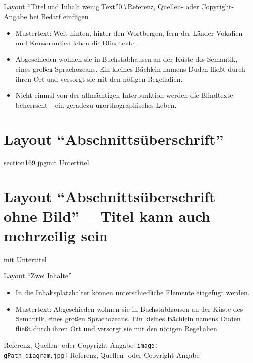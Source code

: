 \documentclass[hyperref={pdfpagelabels=false}, aspectratio=169, t]{beamer}  %
\newcommand{\gPath}{Graphics/}									%
\begin{document}
\begin{textFrame}{Layout ``Titel und Inhalt wenig Text''}{0.7}{Referenz, Quellen- oder Copyright-Angabe bei Bedarf einfügen}

	\begin{itemize}
		\item Mustertext: Weit hinten, hinter den Wortbergen, fern der Länder Vokalien und Konsonantien leben die Blindtexte.
		\item Abgeschieden wohnen sie in Buchstabhausen an der Küste des Semantik, eines großen Sprachozeans. Ein kleines Bächlein namens Duden fließt durch ihren Ort und versorgt sie mit den nötigen Regelialien.
		\item Nicht einmal von der allmächtigen Interpunktion werden die Blindtexte beherrscht – ein geradezu unorthographisches Leben.
	\end{itemize}
\end{textFrame}



\section{Layout ``Abschnittsüberschrift''}

\begin{sectionFrame}{section169.jpg}{mit Untertitel}
\end{sectionFrame}


\section{Layout ``Abschnittsüberschrift ohne Bild''~-- Titel kann auch mehrzeilig sein}

\begin{sectionFrame}{}{mit Untertitel}
\end{sectionFrame}


\begin{textFrame2}{Layout ``Zwei Inhalte''}{}{
		\begin{itemize}
			\item In die Inhaltsplatzhalter können unterschiedliche Elemente eingefügt werden.
			\item Mustertext: Abgeschieden wohnen sie in Buchstabhausen an der Küste des Semantik, eines großen Sprachozeans. 
					Ein kleines Bächlein namens Duden fließt durch ihren Ort und versorgt sie mit den nötigen Regelialien.
		\end{itemize}
}{Referenz, Quellen- oder Copyright-Angabe}{}{\texttt{[image: \\gPath diagram.jpg]}}%
{Referenz, Quellen- oder Copyright-Angabe}
\end{textFrame2}
\end{document}
